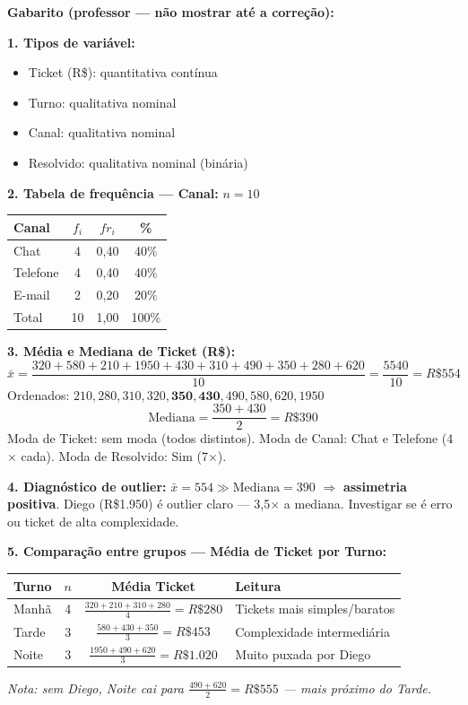 \begin{SolvedBox}
\textbf{Gabarito (professor — não mostrar até a correção):}

\textbf{1. Tipos de variável:}
\begin{itemize}
  \item Ticket (R\$): quantitativa contínua
  \item Turno: qualitativa nominal
  \item Canal: qualitativa nominal
  \item Resolvido: qualitativa nominal (binária)
\end{itemize}

\textbf{2. Tabela de frequência — Canal:} $n = 10$
\begin{center}
\begin{tabular}{|l|c|c|c|}
\hline
\textbf{Canal} & $f_i$ & $fr_i$ & \textbf{\%} \\
\hline
Chat     & 4 & 0,40 & 40\% \\
Telefone & 4 & 0,40 & 40\% \\
E-mail   & 2 & 0,20 & 20\% \\
\hline
Total    & 10 & 1,00 & 100\% \\
\hline
\end{tabular}
\end{center}

\textbf{3. Média e Mediana de Ticket (R\$):}
\[
\bar{x} = \frac{320+580+210+1950+430+310+490+350+280+620}{10}
= \frac{5540}{10} = R\$554
\]
Ordenados: $210, 280, 310, 320, \mathbf{350, 430}, 490, 580, 620, 1950$
\[
\text{Mediana} = \frac{350+430}{2} = R\$390
\]
Moda de Ticket: sem moda (todos distintos).\quad
Moda de Canal: Chat e Telefone (4$\times$ cada).\quad
Moda de Resolvido: Sim (7$\times$).

\textbf{4. Diagnóstico de outlier:}
$\bar{x} = 554 \gg \text{Mediana} = 390$ $\Rightarrow$ \textbf{assimetria positiva}.
Diego (R\$1.950) é outlier claro — 3,5$\times$ a mediana. Investigar se é erro
ou ticket de alta complexidade.

\textbf{5. Comparação entre grupos — Média de Ticket por Turno:}
\begin{center}
\begin{tabular}{|l|c|c|l|}
\hline
\textbf{Turno} & $n$ & \textbf{Média Ticket} & \textbf{Leitura} \\
\hline
Manhã & 4 & $\frac{320+210+310+280}{4} = R\$280$ & Tickets mais simples/baratos \\
Tarde & 3 & $\frac{580+430+350}{3} = R\$453$ & Complexidade intermediária \\
Noite & 3 & $\frac{1950+490+620}{3} = R\$1.020$ & Muito puxada por Diego \\
\hline
\end{tabular}
\end{center}
\textit{Nota: sem Diego, Noite cai para $\frac{490+620}{2} = R\$555$ — mais próximo do Tarde.}


\end{SolvedBox}
